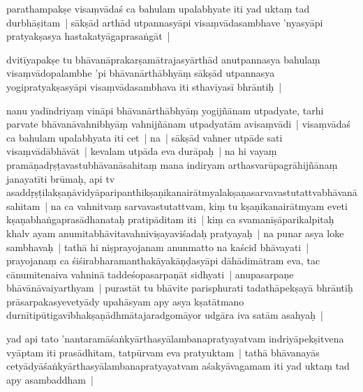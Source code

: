 \documentclass[article,12pt,a4paper]{memoir}%
\newcounter{parCount}
\begin{document}
	  
	  \pstart \leavevmode%
	\label{thakur75-19.10}parathampakṣe visaṃvādaś ca bahulam upalabhyate iti yad uktaṃ tad durbhāṣitam | sākṣād arthād utpannasyāpi visaṃvādasambhave 'nyasyāpi pratyakṣasya hastakatyāgaprasaṅgāt | 
	{}
	\pend%
      

	  
	  \pstart \leavevmode%
	\label{thakur75-19.12}dvitīyapakṣe tu bhāvanāprakarṣamātrajasyārthād anutpannasya bahulaṃ visaṃvādopalambhe 'pi bhāvanārthābhyāṃ sākṣād utpannasya yogipratyakṣasyāpi visaṃvādasambhava iti sthavīyasī bhrāntiḥ | 
	{}
	\pend%
      

	  
	  \pstart \leavevmode%
	\label{thakur75-19.15}nanu yadīndriyaṃ vināpi bhāvanārthābhyāṃ yogijñānam utpadyate, tarhi parvate bhāvanāvahnibhyāṃ vahnijñānam utpadyatām avisaṃvādi | visaṃvādaś ca bahulam upalabhyata iti cet | na | sākṣād vahner utpāde sati visaṃvādābhāvāt | kevalam utpāda eva durāpaḥ | na hi vayaṃ pramāṇadṛṣṭavastubhāvanāsahitaṃ mana indiryam arthasvarūpagrāhijñānaṃ janayatīti brūmaḥ, api tv asaddṛṣṭilakṣaṇāvidyāparipanthikṣaṇikanairātmyalakṣaṇasarvavastutattvabhāvanāsahitam | na ca vahnitvaṃ sarvavastutattvam, kiṃ tu kṣaṇikanairātmyam eveti kṣaṇabhaṅgaprasādhanataḥ pratipāditam iti | kiṃ ca svamanīṣāparikalpitaḥ khalv ayam anumitabhāvitavahniviṣayaviśadaḥ pratyayaḥ | na punar asya loke sambhavaḥ | tathā hi niṣprayojanam anunmatto na kaścid bhāvayati | prayojanaṃ ca śiśirabharamanthakāyakāṇḍasyāpi dāhādimātram eva, tac cānumitenaiva vahninā taddeśopasarpaṇāt sidhyati | anupasarpaṇe bhāvānāvaiyarthyam | purastāt tu bhāvite parisphurati tadathāpekṣayā bhrāntiḥ prāsarpakasyevetyādy upahāsyam apy asya kṣatātmano durnītipūtigavībhakṣaṇādhmātajaradgomāyor udgāra iva satām asahyaḥ | 
	{}
	\pend%
      

	  
	  \pstart \leavevmode%
	\label{thakur75-19.28}yad api tato 'nantaramāśaṅkyārthasyālambanapratyayatvam indriyāpekṣitvena vyāptam iti prasādhitam, tatpūrvam eva pratyuktam | tathā bhāvanayās cetyādyāśaṅkyārthasyālambanapratyayatvam aśakyāvagamam iti yad uktaṃ tad apy asambaddham | 
	{}
	\pend%
      
\end{document}

